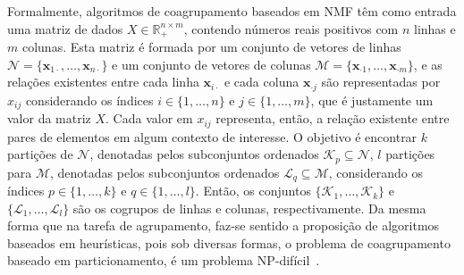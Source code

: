 \documentclass[
    12pt,                %
    oneside,            %
    a4paper,            %
    english,            %
    brazil                %
    ]{abntex2ppgsi}
\begin{document}
Formalmente, algoritmos de coagrupamento baseados em NMF têm como entrada uma matriz de dados $X \in \mathbb{R}^{n \times m}_{+}$, contendo números reais positivos com $n$ linhas e $m$ colunas.
Esta matriz é formada por um conjunto de vetores de linhas $\mathcal{N} = \{ \mathbf{x}_{1 \cdot}, \dots, \mathbf{x}_{n \cdot} \}$ e um conjunto de vetores de colunas $\mathcal{M} = \{ \mathbf{x}_{\cdot 1}, \dots, \mathbf{x}_{\cdot m} \}$, e as relações existentes entre cada linha $\mathbf{x}_{i \cdot}$ e cada coluna $\mathbf{x}_{\cdot j}$ são representadas por $x_{ij}$ considerando os índices $i \in \{1, \dots, n\}$ e $j \in \{1, \dots, m\}$, que é justamente um valor da matriz $X$.
Cada valor em $x_{ij}$ representa, então, a relação existente entre pares de elementos em algum contexto de interesse.
O objetivo é encontrar $k$ partições de $\mathcal{N}$, denotadas pelos subconjuntos ordenados $\mathcal{K}_p \subseteq \mathcal{N}$, $l$ partições para $\mathcal{M}$, denotadas pelos subconjuntos ordenados $\mathcal{L}_q \subseteq \mathcal{M}$, considerando os índices $p \in \{ 1, \dots, k\}$ e $q \in \{1, \dots, l\}$.
Então, os conjuntos $\{\mathcal{K}_1, \dots, \mathcal{K}_k\}$ e $\{\mathcal{L}_1, \dots, \mathcal{L}_l\}$ são os cogrupos de linhas e colunas, respectivamente.
Da mesma forma que na tarefa de agrupamento, faz-se sentido a proposição de algoritmos baseados em heurísticas, pois sob diversas formas, o problema de coagrupamento baseado em particionamento, é um problema NP-difícil~\cite{Bulteau2014}.


\end{document}
